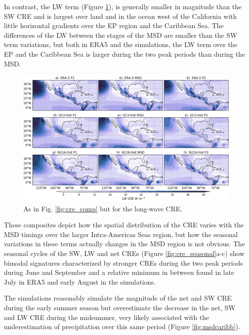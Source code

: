 In contrast, the LW term (Figure \ref{fig:lw_comp}), is generally smaller in magnitude than the SW CRE and is largest over land and in the ocean west of the California with little horizontal gradients over the EP region and the Caribbean Sea. 
The differences of the LW between the stages of the MSD are smaller than the SW term variations, but both in ERA5 and the simulations, the LW term over the EP and the Caribbean Sea is larger during the two peak periods than during the MSD. 

\begin{figure}[t!]
\includegraphics[width=\linewidth]{figures/fig4_lwclim_3.png}
\caption{As in Fig. \ref{fig:cre_comp} but for the long-wave CRE.}
\label{fig:lw_comp}
\end{figure}

These composites depict how the spatial distribution of the CRE varies with the MSD timings over the larger Intra-Americas Seas region, but how the seasonal variations in these terms actually changes in the MSD region is not obvious. The seasonal cycles of the SW, LW and net CREs (Figure \ref{fig:cre_seasonal}a-c) show bimodal signatures characterized by stronger CREs during the two peak periods during June and September and a relative minimum in between found in late July in ERA5 and early August in the simulations. 

The simulations reasonably simulate the magnitude of the net and SW CRE during the early summer season but overestimate the decrease in the net, SW and LW CRE during the midsummer, very likely associated with the underestimation of precipitation over this same period (Figure \ref{fig:msdcaribb}).

